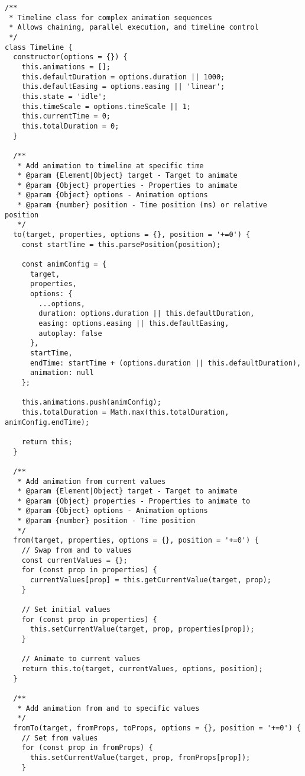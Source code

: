 \documentclass[11pt]{article}
\begin{document}
\begin{verbatim}
/**
 * Timeline class for complex animation sequences
 * Allows chaining, parallel execution, and timeline control
 */
class Timeline {
  constructor(options = {}) {
    this.animations = [];
    this.defaultDuration = options.duration || 1000;
    this.defaultEasing = options.easing || 'linear';
    this.state = 'idle';
    this.timeScale = options.timeScale || 1;
    this.currentTime = 0;
    this.totalDuration = 0;
  }
  
  /**
   * Add animation to timeline at specific time
   * @param {Element|Object} target - Target to animate
   * @param {Object} properties - Properties to animate
   * @param {Object} options - Animation options
   * @param {number} position - Time position (ms) or relative position
   */
  to(target, properties, options = {}, position = '+=0') {
    const startTime = this.parsePosition(position);
    
    const animConfig = {
      target,
      properties,
      options: {
        ...options,
        duration: options.duration || this.defaultDuration,
        easing: options.easing || this.defaultEasing,
        autoplay: false
      },
      startTime,
      endTime: startTime + (options.duration || this.defaultDuration),
      animation: null
    };
    
    this.animations.push(animConfig);
    this.totalDuration = Math.max(this.totalDuration, animConfig.endTime);
    
    return this;
  }
  
  /**
   * Add animation from current values
   * @param {Element|Object} target - Target to animate
   * @param {Object} properties - Properties to animate to
   * @param {Object} options - Animation options
   * @param {number} position - Time position
   */
  from(target, properties, options = {}, position = '+=0') {
    // Swap from and to values
    const currentValues = {};
    for (const prop in properties) {
      currentValues[prop] = this.getCurrentValue(target, prop);
    }
    
    // Set initial values
    for (const prop in properties) {
      this.setCurrentValue(target, prop, properties[prop]);
    }
    
    // Animate to current values
    return this.to(target, currentValues, options, position);
  }
  
  /**
   * Add animation from and to specific values
   */
  fromTo(target, fromProps, toProps, options = {}, position = '+=0') {
    // Set from values
    for (const prop in fromProps) {
      this.setCurrentValue(target, prop, fromProps[prop]);
    }
    

\end{verbatim}
\end{document}
